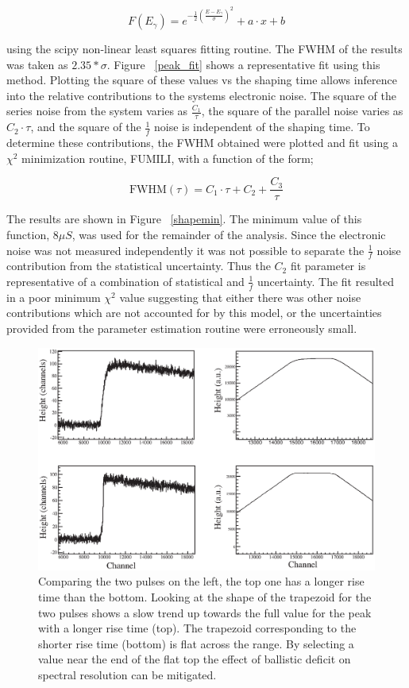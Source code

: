 \documentclass[twocolumn,preprintnumbers,superscriptaddress,amsmath,amssymb,floatfix]{revtex4-1}
\begin{document}
\begin{equation}
\label{gauss_lin}
F(E_{\gamma}) = e^{-\frac{1}{2}(\frac{E-E_{\gamma}}{\sigma})^2}+a\cdot x+b
\end{equation}


\noindent using the scipy non-linear least squares fitting routine. The FWHM of the results was taken as $2.35*\sigma$. Figure ~\ref{peak_fit} shows a representative fit using this method.  Plotting the square of these values vs the shaping time allows inference into the relative contributions to the systems electronic noise. The square of the series noise from the system varies as $\frac{C_1}{\tau}$, the square of the parallel noise varies as $C_2 \cdot \tau$, and the square of the $\frac{1}{f}$ noise is independent of the shaping time\cite{Radeka}. To determine these contributions, the FWHM obtained were plotted and fit using a $\chi^2$ minimization routine, FUMILI, with a function of the form;

\begin{equation}
\label{noisefunc}
\text{FWHM}(\tau) =  C_1 \cdot \tau + C_2 + \frac{C_3}{\tau}
\end{equation}


\noindent The results are shown in Figure ~\ref{shapemin}. The minimum value of this function, $8 \mu S$, was used for the remainder of the analysis. Since the electronic noise was not measured independently it was not possible to separate the $\frac{1}{f}$ noise contribution from the statistical uncertainty. Thus the $C_2$ fit parameter is representative of a combination of statistical and $\frac{1}{f}$ uncertainty.  The fit resulted in a poor minimum $\chi^2$ value suggesting that either there was other noise contributions which are not accounted for by this model, or the uncertainties provided from the parameter estimation routine were erroneously small.
\begin{figure}
\includegraphics[width=.52\textwidth]{balistic_deficit.eps}
\caption{Comparing the two pulses on the left, the top one has a longer rise time than the bottom. Looking at the shape of the trapezoid for the two pulses shows a slow trend up towards the full value for the peak with a longer rise time (top). The trapezoid corresponding to the shorter rise time (bottom) is flat across the range. By selecting a value near the end of the flat top the effect of ballistic deficit on spectral resolution can be mitigated. 
\label{balistic}}
\end{figure}
\end{document}
